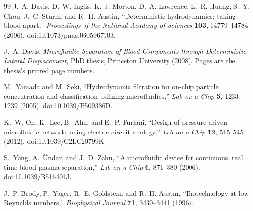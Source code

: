 \begin{thebibliography}{99}
J.~A. Davis, D.~W. Inglis, K.~J. Morton, D.~A. Lawrence, L.~R. Huang, S.~Y. Chou, J.~C. Sturm,
and R.~H. Austin,
``Deterministic hydrodynamics: taking blood apart,''
\emph{Proceedings of the National Academy of Sciences} \textbf{103}, 14779--14784 (2006).
doi:10.1073/pnas.0605967103.

J.~A. Davis,
\emph{Microfluidic Separation of Blood Components through Deterministic Lateral Displacement},
PhD thesis, Princeton University (2008). Pages are the thesis's printed page numbers.

M.~Yamada and M.~Seki,
``Hydrodynamic filtration for on-chip particle concentration and classification utilizing microfluidics,''
\emph{Lab on a Chip} \textbf{5}, 1233--1239 (2005). doi:10.1039/B509386D.

K.~W. Oh, K.~Lee, B.~Ahn, and E.~P. Furlani,
``Design of pressure-driven microfluidic networks using electric circuit analogy,''
\emph{Lab on a Chip} \textbf{12}, 515--545 (2012). doi:10.1039/C2LC20799K.

S.~Yang, A.~\"Undar, and J.~D. Zahn,
``A microfluidic device for continuous, real time blood plasma separation,''
\emph{Lab on a Chip} \textbf{6}, 871--880 (2006). doi:10.1039/B516401J.

J.~P. Brody, P.~Yager, R.~E. Goldstein, and R.~H. Austin,
``Biotechnology at low Reynolds numbers,''
\emph{Biophysical Journal} \textbf{71}, 3430--3441 (1996).

\end{thebibliography}


